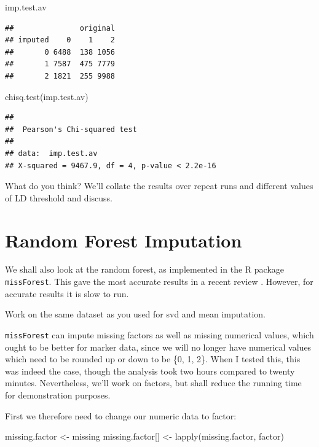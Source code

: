 \documentclass[
]{book}
\newenvironment{Shaded}{\begin{snugshade}}{\end{snugshade}}
\newcommand{\FunctionTok}[1]{\textcolor[rgb]{0.00,0.00,0.00}{#1}}
\newcommand{\NormalTok}[1]{#1}
\newcommand{\OtherTok}[1]{\textcolor[rgb]{0.56,0.35,0.01}{#1}}
\begin{document}
\begin{Shaded}
\begin{Highlighting}[]
\NormalTok{imp.test.av}
\end{Highlighting}
\end{Shaded}

\begin{verbatim}
##               original
## imputed    0    1    2
##       0 6488  138 1056
##       1 7587  475 7779
##       2 1821  255 9988
\end{verbatim}

\begin{Shaded}
\begin{Highlighting}[]
\FunctionTok{chisq.test}\NormalTok{(imp.test.av)}
\end{Highlighting}
\end{Shaded}

\begin{verbatim}
## 
##  Pearson's Chi-squared test
## 
## data:  imp.test.av
## X-squared = 9467.9, df = 4, p-value < 2.2e-16
\end{verbatim}

What do you think? We'll collate the results over repeat runs and different values of LD threshold and discuss.

\hypertarget{random-forest-imputation}{%
\section{Random Forest Imputation}\label{random-forest-imputation}}

We shall also look at the random forest, as implemented in the R package \texttt{missForest}. This gave the most accurate results in a recent review \citet{Rutkoski_2013}. However, for accurate results it is slow to run.

Work on the same dataset as you used for svd and mean imputation.

\texttt{missForest} can impute missing factors as well as missing numerical values, which ought to be better for marker data, since we will no longer have numerical values which need to be rounded up or down to be \{0, 1, 2\}. When I tested this, this was indeed the case, though the analysis took two hours compared to twenty minutes. Nevertheless, we'll work on factors, but shall reduce the running time for demonstration purposes.

First we therefore need to change our numeric data to factor:

\begin{Shaded}
\begin{Highlighting}[]
\NormalTok{missing.factor }\OtherTok{\textless{}{-}}\NormalTok{ missing}
\NormalTok{missing.factor[] }\OtherTok{\textless{}{-}} \FunctionTok{lapply}\NormalTok{(missing.factor, factor)}
\end{Highlighting}
\end{Shaded}
\end{document}
